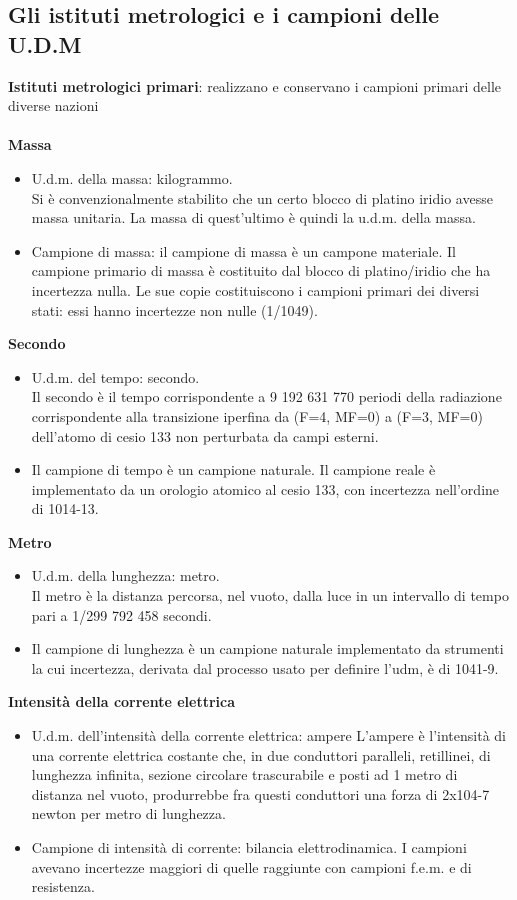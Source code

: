 \documentclass{article}
\begin{document}
\subsection{Gli istituti metrologici e i campioni delle U.D.M}

\textbf{Istituti metrologici primari}: realizzano e conservano i campioni primari delle diverse nazioni \\ \\
\textbf{Massa}
\begin{itemize}
    \item U.d.m. della massa: kilogrammo. \\ 
    Si è convenzionalmente stabilito che un certo blocco di platino iridio avesse massa unitaria. La massa di quest’ultimo è quindi la u.d.m. della massa.
    \item Campione di massa: il campione di massa è un campone materiale. Il campione primario di massa è costituito dal blocco di platino/iridio che ha incertezza nulla. Le sue copie costituiscono i campioni primari dei diversi stati: essi hanno incertezze non nulle (1/1049). 
\end{itemize} 
\textbf{Secondo}
\begin{itemize}
    \item U.d.m. del tempo: secondo. \\
    Il secondo è il tempo corrispondente a 9 192 631 770 periodi della radiazione corrispondente alla transizione iperfina da (F=4, MF=0) a (F=3, MF=0) dell'atomo di cesio 133 non perturbata da campi esterni. 
    \item Il campione di tempo è un campione naturale. Il campione reale è implementato da un orologio atomico al cesio 133, con incertezza nell'ordine di 1014-13. 
\end{itemize}
\textbf{Metro}
\begin{itemize}
    \item U.d.m. della lunghezza: metro. \\
    Il metro è la distanza percorsa, nel vuoto, dalla luce in un intervallo di tempo pari a 1/299 792 458 secondi. 
    \item Il campione di lunghezza è un campione naturale implementato da strumenti la cui incertezza, derivata dal processo usato per definire l’udm, è di 1041-9. 
\end{itemize} 
\textbf{Intensità della corrente elettrica }
\begin{itemize}
    \item U.d.m. dell'intensità della corrente elettrica: ampere 
    L’ampere è l'intensità di una corrente elettrica costante che, in due conduttori paralleli, retillinei, di lunghezza infinita, sezione circolare trascurabile e posti ad 1 metro di distanza 
    nel vuoto, produrrebbe fra questi conduttori una forza di 2x104-7 newton per metro di lunghezza. 
    \item Campione di intensità di corrente: bilancia elettrodinamica. I campioni avevano incertezze maggiori di quelle raggiunte con campioni f.e.m. e di resistenza. 
\end{itemize}
\end{document}
